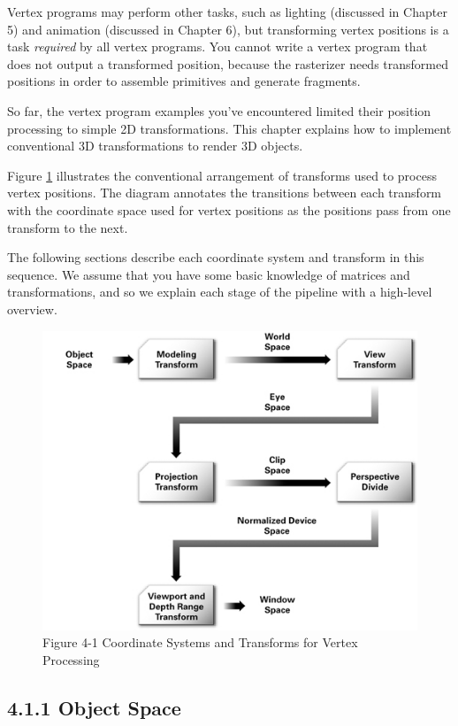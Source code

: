 \documentclass{book}
\begin{document}
Vertex programs may perform other tasks, such as lighting (discussed in Chapter 5) and animation (discussed in Chapter 6), but transforming vertex positions is a task \textit{required} by all vertex programs. You cannot write a vertex program that does not output a transformed position, because the rasterizer needs transformed positions in order to assemble primitives and generate fragments.

So far, the vertex program examples you've encountered limited their position processing to simple 2D transformations. This chapter explains how to implement conventional 3D transformations to render 3D objects.

Figure \ref{fig:4-1} illustrates the conventional arrangement of transforms used to process vertex positions. The diagram annotates the transitions between each transform with the coordinate space used for vertex positions as the positions pass from one transform to the next.

The following sections describe each coordinate system and transform in this sequence. We assume that you have some basic knowledge of matrices and transformations, and so we explain each stage of the pipeline with a high-level overview.

\begin{figure}
    \centering
    \includegraphics[width=1\linewidth]{Images/fig4_1.jpg}
    \caption{Figure 4-1 Coordinate Systems and Transforms for Vertex Processing}
    \label{fig:4-1}
\end{figure}

\subsection{4.1.1 Object Space}
\end{document}

